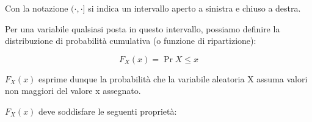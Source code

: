 Con la notazione $(\cdot , \cdot ]$ si indica un intervallo aperto a sinistra e chiuso a destra. \newline 

Per una variabile qualsiasi posta in questo intervallo, possiamo definire la distribuzione di probabilità cumulativa (o funzione di ripartizione): 

{
    \Large 
    \begin{equation}
        F_X (x) = \Pr{X \leq x}
    \end{equation}
}

$F_X (x)$ esprime dunque la probabilità che la variabile aleatoria X assuma valori non maggiori del valore x assegnato. \newline 

$F_X (x)$ deve soddisfare le seguenti proprietà: 

